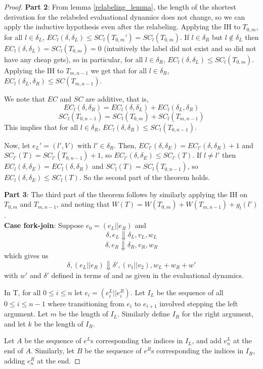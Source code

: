 \begin{proof}
\textbf{Part 2}: From lemma \ref{relabeling_lemma}, the length of the shortest derivation for the relabeled evaluational dynamics does not change, so we can apply the inductive hypothesis even after the relabeling. Applying the IH to $T_{0,m}$, for all $l \in \delta_L$, $EC_l(\delta, \delta_L) \leq SC_l(T_{0,m}') = SC_l(T_{0,m})$. If $l \in \delta_R$ but $l \not\in \delta_L$ then $EC_l(\delta, \delta_L) = SC_l(T_{0,m}) = 0$ (intuitively the label did not exist and so did not have any cheap gets), so in particular, for all $l \in \delta_R$, $EC_l(\delta, \delta_L) \leq SC_l(T_{0,m})$. Applying the IH to $T_{m,n-1}$ we get that for all $l \in \delta_R$, $EC_l(\delta_L, \delta_R) \leq SC(T_{m,n-1})$.

We note that $EC$ and $SC$ are additive, that is,
$$EC_l(\delta, \delta_R) = EC_l(\delta, \delta_L) + EC_l(\delta_L, \delta_R)$$
$$SC_l(T_{0,n-1}) = SC_l(T_{0,m}) + SC_l(T_{m,n-1})$$
This implies that for all $l \in \delta_R$, $EC_l(\delta, \delta_R) \leq SC_l(T_{0,n-1})$. 

Now, let $e_L' = (l',V)$ with $l' \in \delta_R$. Then, $EC_{l'}(\delta, \delta_E) = EC_{l'}(\delta, \delta_R) + 1$ and $SC_{l'}(T) = SC_{l'}(T_{0,n-1}) + 1$, so $EC_{l'}(\delta, \delta_E) \leq SC_{l'}(T)$. If $l \neq l'$ then $EC_{l}(\delta, \delta_E) = EC_{l}(\delta, \delta_R)$ and $SC_{l}(T) = SC_{l}(T_{0,n-1})$, so $EC_{l}(\delta, \delta_E) \leq SC_{l}(T)$. So the second part of the theorem holds.

\textbf{Part 3}: The third part of the theorem follows by similarly applying the IH on $T_{0,m}$ and $T_{m,n-1}$, and noting that $W(T) = W(T_{0,m}) + W(T_{m,n-1}) + g_l(l')$.
\\

\noindent \textbf{Case fork-join}: Suppose $e_0 = (e_L || e_R)$ and
$$\delta, e_L \Downarrow \delta_L, v_L, w_L$$
$$\delta, e_R \Downarrow \delta_R, v_R, w_R$$
which gives us
$$\delta, (e_L || e_R) \Downarrow \delta', (v_1 || v_2), w_L + w_R + w'$$
with $w'$ and $\delta'$ defined in terms of  and  as given in the evaluational dynamics.

In T, for all $0 \leq i \leq n$ let $e_i = (e^L_i || e^R_i)$. Let $I_L$ be the sequence of all $0 \leq i \leq n-1$ where transitioning from $e_i$ to $e_{i+1}$ involved stepping the left argument. Let $m$ be the length of $I_L$. Similarly define $I_R$ for the right argument, and let $k$ be the length of $I_R$.

Let $A$ be the sequence of $e^L$s corresponding the indices in $I_L$, and add $e^L_n$ at the end of $A$. Similarly, let $B$ be the sequence of $e^R$s corresponding the indices in $I_R$, adding $e^R_n$ at the end.


\end{proof}
